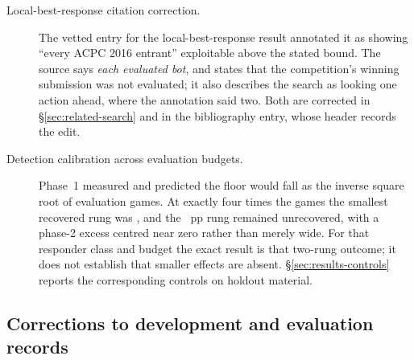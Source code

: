 \begin{description}
\item[Local-best-response citation correction.] The vetted entry for
  the local-best-response result annotated it as showing ``every ACPC 2016 entrant'' exploitable
  above the stated bound. The source says \emph{each evaluated bot}, and states that the
  competition's winning submission was not evaluated; it also describes the search as looking one
  action ahead, where the annotation said two. Both are corrected in
  \S\ref{sec:related-search} and in the bibliography entry, whose header records the edit.

\item[Detection calibration across evaluation budgets.] Phase~1 measured
  \vsevenFloorPhaseOne{} and predicted the floor would fall as the inverse square root of evaluation
  games. At exactly four times the games the smallest recovered rung was \vsevenPrimaryFloor{}, and
  the \vsevenFloorRungBelow{}~pp rung remained unrecovered, with a phase-2 excess centred near zero
  rather than merely wide. For that responder class and budget the exact result is that two-rung
  outcome; it does not establish that smaller effects are absent. \S\ref{sec:results-controls}
  reports the corresponding controls on holdout material.

\end{description}

\subsection{Corrections to development and evaluation records}
\label{app:corrections-self}


